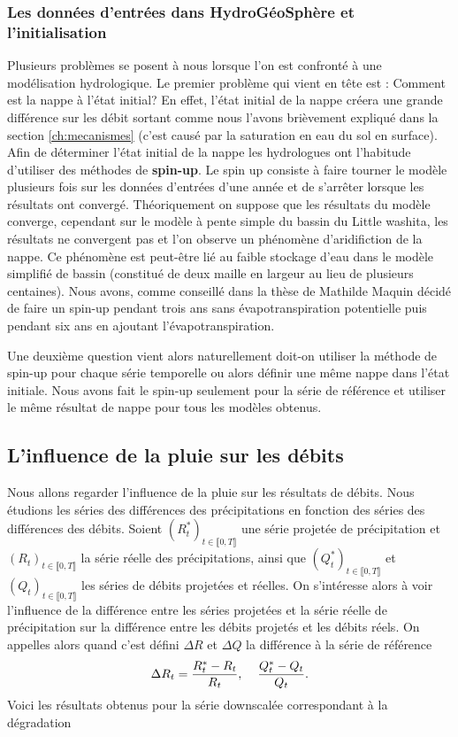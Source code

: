 \documentclass[a4paper,11pt]{article}
\begin{document}
\subsubsection{Les données d'entrées dans HydroGéoSphère et l'initialisation}

Plusieurs problèmes se posent à nous lorsque l'on est confronté à une modélisation hydrologique. Le premier problème qui vient en tête est : Comment est la nappe à l'état initial? En effet, l'état initial de la nappe créera une grande différence sur les débit sortant comme nous l'avons brièvement expliqué dans la section \ref{ch:mecanismes} (c'est causé par la saturation en eau du sol en surface). Afin de déterminer l'état initial de la nappe les hydrologues ont l'habitude d'utiliser des méthodes de \textbf{spin-up}. Le spin up consiste à faire tourner le modèle plusieurs fois sur les données d'entrées d'une année et de s'arrêter lorsque les résultats ont convergé. Théoriquement on suppose que les résultats du modèle converge, cependant sur le modèle à pente simple du bassin du Little washita, les résultats ne convergent pas et l'on observe un phénomène d'aridifiction de la nappe. Ce phénomène est peut-être lié au faible stockage d'eau dans le modèle simplifié de bassin (constitué de deux maille en largeur au lieu de plusieurs centaines). Nous avons, comme conseillé dans la thèse de Mathilde Maquin décidé de faire un spin-up pendant trois ans sans évapotranspiration potentielle puis pendant six ans en ajoutant l'évapotranspiration. 

Une deuxième question vient alors naturellement doit-on utiliser la méthode de spin-up pour chaque série temporelle ou alors définir une même nappe dans l'état initiale. Nous avons fait le spin-up seulement pour la série de référence et utiliser le même résultat de nappe pour tous les modèles obtenus. 


\subsection{L'influence de la pluie sur les débits}
\label{ch:classification delta deb delta pluie}
Nous allons regarder l'influence de la pluie sur les résultats de débits. Nous étudions les séries des différences des précipitations en fonction des séries des différences des débits. Soient $(R^{*}_t)_{t \in \llbracket 0, T\rrbracket}$ une série projetée de précipitation et $(R_t)_{t \in \llbracket 0, T\rrbracket}$ la série réelle des précipitations, ainsi que $(Q^{*}_t)_{t \in \llbracket 0, T\rrbracket}$ et $(Q_t)_{t \in \llbracket 0, T\rrbracket}$ les séries de débits projetées et réelles. On s'intéresse alors à voir l'influence de la différence entre les séries projetées et la série réelle de précipitation sur la différence entre les débits projetés et les débits réels. On appelles alors quand c'est défini $\Delta R$ et $\Delta Q$ la différence à la série de référence 
\[\Delta R_t=\frac{R^{*}_t-R_t}{R_t}, \hspace{4mm} \frac{Q^{*}_t-Q_t}{Q_t}.\]
Voici les résultats obtenus pour la série downscalée correspondant à la dégradation  
    
\end{document}
